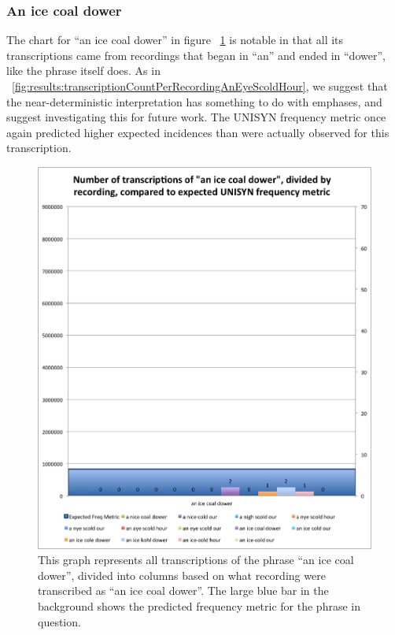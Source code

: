\subsubsection{An ice coal dower}
\label{results:transcriptionCountPerRecording:an_ice_coal_dower}

The chart for ``an ice coal dower'' in figure ~\ref{fig:results:transcriptionCountPerRecordingAnIceCoalDower} is notable in that all its transcriptions came from recordings that began in ``an'' and ended in ``dower'', like the phrase itself does. As in ~\ref{fig:results:transcriptionCountPerRecordingAnEyeScoldHour}, we suggest that the near-deterministic interpretation has something to do with emphases, and suggest investigating this for future work. The UNISYN frequency metric once again predicted higher expected incidences than were actually observed for this transcription.

\begin{figure}
\includegraphics[width=\textwidth]{TranscriptionCountPerRecording_anIceCoalDower.jpg}
\captionfonts
\caption[Transcription Count Per Recording for the transcribed phrase ``an ice coal dower'']{ This graph represents all transcriptions of the phrase ``an ice coal dower'', divided into columns based on what recording were transcribed as ``an ice coal dower''. The large blue bar in the background shows the predicted frequency metric for the phrase in question.}
\label{fig:results:transcriptionCountPerRecordingAnIceCoalDower}
\end{figure}







